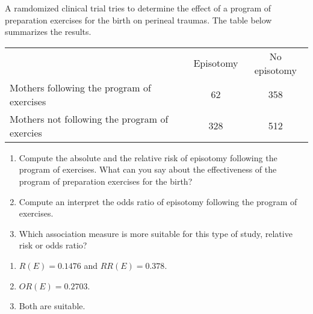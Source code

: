 {A ramdomized clinical trial tries to determine the effect of a program of preparation exercises for the birth on perineal traumas. 
The table below summarizes the results. 
\begin{center}
	\begin{tabular}{lcc}
		\toprule
		 & Episotomy & No episotomy\\
		 Mothers following the program of exercises & 62 & 358 \\
		 Mothers not following the program of exercies & 328 & 512\\
		\bottomrule
	\end{tabular}
\end{center}

\begin{enumerate}
\item Compute the absolute and the relative risk of episotomy following the program of exercises.
What can you say about the effectiveness of the program of preparation exercises for the birth?
\item Compute an interpret the odds ratio of episotomy following the program of exercises.
\item Which association measure is more suitable for this type of study, relative risk or odds ratio?
\end{enumerate}
}
{
\begin{enumerate}
\item $R(E)=0.1476$ and $RR(E)=0.378$.
\item $OR(E)=0.2703$.
\item Both are suitable.
\end{enumerate}
}
{}

